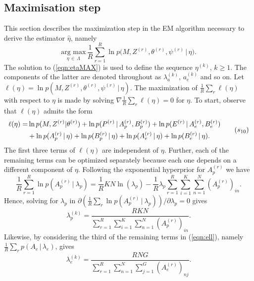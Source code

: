 \documentclass[11pt]{amsart}
\theoremstyle{definition}
\theoremstyle{remark}
\begin{document}
\subsection{Maximisation step}
This section describes the maximization step in the EM algorithm
necessary to derive the estimator $\hat\eta$, namely
\begin{equation}
   \label{eqn:etaMAX}
    \underset{\eta\,\in\,\Lambda}{\text{arg max}}\,
    \frac{1}{R}\sum_{r=1}^R \ln p\big(M, Z^{(r)}, \theta^{(r)},
    \psi^{(r)}\,|\, \eta\big). \tag{$s_9$}
\end{equation}
The solution to (\ref{eqn:etaMAX}) is used to define the sequence
$\eta^{(k)}$, $k \geq 1$. The components of the latter are denoted
throughout as $\lambda_a^{(k)}$, $a_e^{(k)}$ and so on.  Let
$\ell(\eta) = \ln p(M, Z^{(r)}, \theta^{(r)}, \psi^{(r)}\,|\,
\eta)$. The maximization of $\frac{1}{R}\sum_{r}\ell(\eta)$ with
respect to $\eta$ is made by solving
$\nabla\frac{1}{R}\sum_{r}\ell(\eta) = 0$ for $\eta$.  To start,
observe that $\ell(\eta)$ admits the form
\begin{equation}
 \label{eqn:ell}
 \begin{aligned}
  \ell(\eta)
  =&
  \ln p(M, Z^{(r)} | \theta^{(r)})  + \ln p(P^{(r)}\,|\, A_p^{(r)},
  B_p^{(r)}) + \ln p(E^{(r)}\,|\, A_e^{(r)},  B_e^{(r)})  \\
  &+
  \ln p(A_p^{(r)}\,|\, \eta) + \ln p(B_p^{(r)}\,|\, \eta) +
  \ln p(A_e^{(r)}\,|\, \eta) + \ln p(B_e^{(r)}\,|\, \eta).
 \end{aligned}
 \tag{$s_{10}$}
\end{equation}
The first three terms of $\ell(\eta)$ are independent of
$\eta$. Further, each of the remaining terms can be optimized
separately because each one depends on a different component of
$\eta$. Following the exponential hyperprior for $A_p^{(r)}$ we have
\[
   \frac{1}{R}\sum_{r=1}^R \ln  p(A_p^{(r)}\,|\ \lambda_p)
  = 
  \frac{1}{R}KN\ln(\lambda_p) - \frac{1}{R}\lambda_p\sum_{r=1}^R
  \sum_{i=1}^K\sum_{n=1}^N (A_p^{(r)})_{in}.
\]
Hence, solving for $\lambda_p$ in $\partial (\frac{1}{R}\sum_r \ln
p(A_p^{(r)}\,|\ \lambda_p))/\partial\lambda_p = 0$ gives
\[
  \lambda_p^{(k)} = \frac{RKN}{\sum_{r=1}^R \sum_{i=1}^K 
    \sum_{n=1}^N (A_p^{(r)})_{in}}.
\]
Likewise, by considering the third of the remaining terms in
(\ref{eqn:ell}), namely $\frac{1}{R} \sum_r 
p(A_e\,|\, \lambda_e)$, gives
\[
  \lambda_e^{(k)} = \frac{RNG}{\sum_{r=1}^R \sum_{n=1}^N
    \sum_{j=1}^G (A_e^{(r)})_{nj}}.
\]
\end{document}
